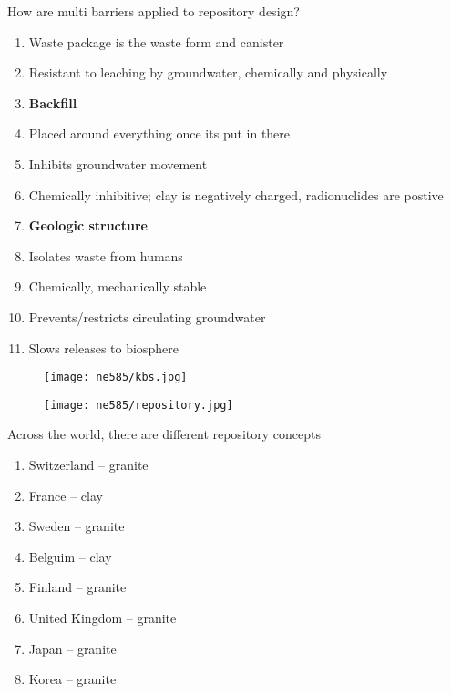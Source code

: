 \documentclass[aspectratio=1610,pdftex,dvipsnames,compress,xcolor={dvipsnames}]{beamer}
\begin{document}
\begin{frame}{How are multi barriers applied to repository design?}
    \begin{enumerate}[series=outerlist,topsep=0pt,itemsep=1pt,leftmargin=*,label=(\arabic*)]
        \item[]Waste package is the waste form and canister
        \item[]Resistant to leaching by groundwater, chemically and physically
            \vspace{0.15in}
        \item[]\textbf{Backfill}
        \item[]Placed around everything once its put in there
        \item[]Inhibits groundwater movement
        \item[]Chemically inhibitive; clay is negatively charged, radionuclides are postive
            \vspace{0.15in}
        \item[]\textbf{Geologic structure}
        \item[]Isolates waste from humans 
        \item[]Chemically, mechanically stable
        \item[]Prevents/restricts circulating groundwater
        \item[]Slows releases to biosphere
    \end{enumerate}
\end{frame}


\begin{frame}{}
    \begin{figure}
        \centering
        \texttt{[image: ne585/kbs.jpg]}
    \end{figure}
\end{frame}


\begin{frame}{}
    \begin{figure}
        \centering
        \texttt{[image: ne585/repository.jpg]}
    \end{figure}
\end{frame}


\begin{frame}{Across the world, there are different repository concepts}
    \begin{enumerate}[series=outerlist,topsep=0pt,itemsep=18pt,leftmargin=*,label=(\arabic*)]
        \item[]Switzerland -- granite
        \item[]France -- clay
        \item[]Sweden -- granite
        \item[]Belguim -- clay
        \item[]Finland -- granite 
        \item[]United Kingdom -- granite
        \item[]Japan -- granite
        \item[]Korea -- granite
    \end{enumerate}
\end{frame}
\end{document}

